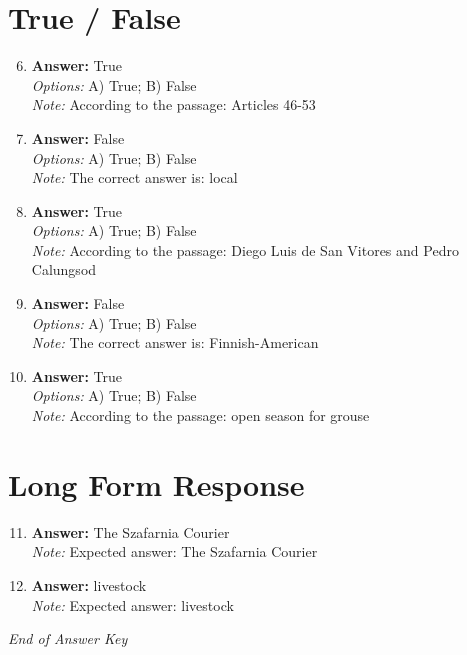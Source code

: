 \documentclass[12pt]{article}
\begin{document}
\section*{True / False}
\begin{enumerate}[label=\arabic*.]
\setcounter{enumi}{5}
\item \textbf{Answer:} True
\\ \textit{Options:} A) True; B) False
\\ \textit{Note:} According to the passage: Articles 46-53
\item \textbf{Answer:} False
\\ \textit{Options:} A) True; B) False
\\ \textit{Note:} The correct answer is: local
\item \textbf{Answer:} True
\\ \textit{Options:} A) True; B) False
\\ \textit{Note:} According to the passage: Diego Luis de San Vitores and Pedro Calungsod
\item \textbf{Answer:} False
\\ \textit{Options:} A) True; B) False
\\ \textit{Note:} The correct answer is: Finnish-American
\item \textbf{Answer:} True
\\ \textit{Options:} A) True; B) False
\\ \textit{Note:} According to the passage: open season for grouse
\end{enumerate}

\section*{Long Form Response}
\begin{enumerate}[label=\arabic*.]
\setcounter{enumi}{10}
\item \textbf{Answer:} The Szafarnia Courier
\\ \textit{Note:} Expected answer: The Szafarnia Courier
\item \textbf{Answer:} livestock
\\ \textit{Note:} Expected answer: livestock
\end{enumerate}

\vfill
\noindent\textit{End of Answer Key}
\end{document}
